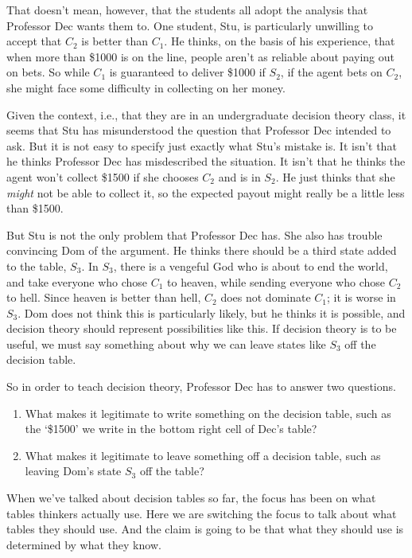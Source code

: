 \documentclass[11pt,]{book}
\providecommand{\tightlist}{%
  \setlength{\itemsep}{0pt}\setlength{\parskip}{0pt}}
\begin{document}
That doesn't mean, however, that the students all adopt the analysis that Professor Dec wants them to. One student, Stu, is particularly unwilling to accept that \(C_2\) is better than \(C_1\). He thinks, on the basis of his experience, that when more than \$1000 is on the line, people aren't as reliable about paying out on bets. So while \(C_1\) is guaranteed to deliver \$1000 if \(S_2\), if the agent bets on \(C_2\), she might face some difficulty in collecting on her money.

Given the context, i.e., that they are in an undergraduate decision theory class, it seems that Stu has misunderstood the question that Professor Dec intended to ask. But it is not easy to specify just exactly what Stu's mistake is. It isn't that he thinks Professor Dec has misdescribed the situation. It isn't that he thinks the agent won't collect \$1500 if she chooses \(C_2\) and is in \(S_2\). He just thinks that she \emph{might} not be able to collect it, so the expected payout might really be a little less than \$1500.

But Stu is not the only problem that Professor Dec has. She also has trouble convincing Dom of the argument. He thinks there should be a third state added to the table, \(S_3\). In \(S_3\), there is a vengeful God who is about to end the world, and take everyone who chose \(C_1\) to heaven, while sending everyone who chose \(C_2\) to hell. Since heaven is better than hell, \(C_2\) does not dominate \(C_1\); it is worse in \(S_3\). Dom does not think this is particularly likely, but he thinks it is possible, and decision theory should represent possibilities like this. If decision theory is to be useful, we must say something about why we can leave states like \(S_3\) off the decision table.

So in order to teach decision theory, Professor Dec has to answer two questions.

\begin{enumerate}
\def\labelenumi{\arabic{enumi}.}
\tightlist
\item
  What makes it legitimate to write something on the decision table, such as the `\$1500' we write in the bottom right cell of Dec's table?
\item
  What makes it legitimate to leave something off a decision table, such as leaving Dom's state \(S_3\) off the table?
\end{enumerate}

When we've talked about decision tables so far, the focus has been on what tables thinkers actually use. Here we are switching the focus to talk about what tables they should use. And the claim is going to be that what they should use is determined by what they know.
\end{document}
